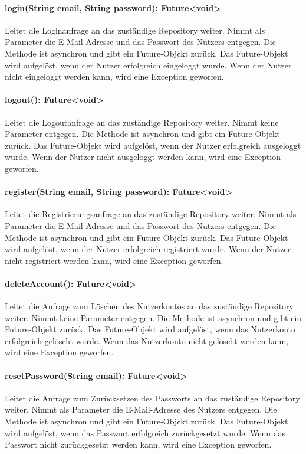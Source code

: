 \documentclass[parskip=full]{scrartcl}
\begin{document}
\paragraph{login(String email, String password): Future<void>}
Leitet die Loginanfrage an das zuständige Repository weiter. Nimmt als Parameter die E-Mail-Adresse und das Passwort des Nutzers entgegen. Die Methode ist asynchron und gibt ein Future-Objekt zurück. Das Future-Objekt wird aufgelöst, wenn der Nutzer erfolgreich eingeloggt wurde. Wenn der Nutzer nicht eingeloggt werden kann, wird eine Exception geworfen.
\paragraph{logout(): Future<void>}
Leitet die Logoutanfrage an das zuständige Repository weiter. Nimmt keine Parameter entgegen. Die Methode ist asynchron und gibt ein Future-Objekt zurück. Das Future-Objekt wird aufgelöst, wenn der Nutzer erfolgreich ausgeloggt wurde. Wenn der Nutzer nicht ausgeloggt werden kann, wird eine Exception geworfen.
\paragraph{register(String email, String password): Future<void>}
Leitet die Registrierungsanfrage an das zuständige Repository weiter. Nimmt als Parameter die E-Mail-Adresse und das Passwort des Nutzers entgegen. Die Methode ist asynchron und gibt ein Future-Objekt zurück. Das Future-Objekt wird aufgelöst, wenn der Nutzer erfolgreich registriert wurde. Wenn der Nutzer nicht registriert werden kann, wird eine Exception geworfen.
\paragraph{deleteAccount(): Future<void>}
Leitet die Anfrage zum Löschen des Nutzerkontos an das zuständige Repository weiter. Nimmt keine Parameter entgegen. Die Methode ist asynchron und gibt ein Future-Objekt zurück. Das Future-Objekt wird aufgelöst, wenn das Nutzerkonto erfolgreich gelöscht wurde. Wenn das Nutzerkonto nicht gelöscht werden kann, wird eine Exception geworfen.
\paragraph{resetPassword(String email): Future<void>}
Leitet die Anfrage zum Zurücksetzen des Passworts an das zuständige Repository weiter. Nimmt als Parameter die E-Mail-Adresse des Nutzers entgegen. Die Methode ist asynchron und gibt ein Future-Objekt zurück. Das Future-Objekt wird aufgelöst, wenn das Passwort erfolgreich zurückgesetzt wurde. Wenn das Passwort nicht zurückgesetzt werden kann, wird eine Exception geworfen.
\end{document}
